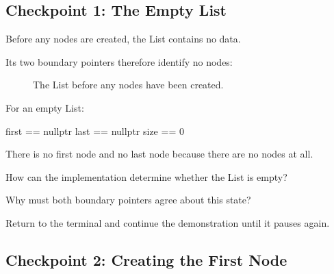\documentclass{csc2059practical}
\begin{document}
\subsection{Checkpoint 1: The Empty List}

Before any nodes are created, the List contains no data.

Its two boundary pointers therefore identify no nodes:

\begin{figure}[htbp]
    \centering

    \caption{The List before any nodes have been created.}
    \label{fig:list-empty}
\end{figure}

For an empty List:

\begin{cppcode}
first == nullptr
last  == nullptr
size  == 0
\end{cppcode}

There is no first node and no last node because there are no nodes at all.

\begin{reflectionbox}
How can the implementation determine whether the List is empty?

Why must both boundary pointers agree about this state?
\end{reflectionbox}

Return to the terminal and continue the demonstration until it pauses again.

\subsection{Checkpoint 2: Creating the First Node}
\end{document}
